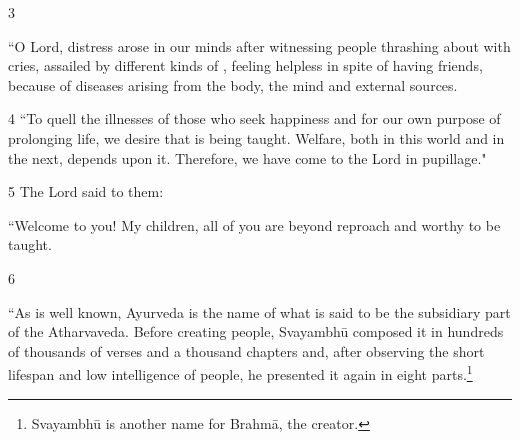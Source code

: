 \documentclass[12pt]{article}
\begin{document}
\begin{translation}
    \item[3]

“O Lord, distress arose in our minds after witnessing people thrashing about with
cries, assailed by different kinds of , 
feeling helpless in spite 
of having friends, because of diseases arising from the body, the mind and
external sources.


    

    \let\uncertain\texttt
    
\item[4]    
“To quell the illnesses of those who seek happiness and for our own purpose of
prolonging life, we desire  that is being
taught.  Welfare, both in this world and in
    the next, depends upon it. Therefore, we have come to the Lord in pupillage." %


\item[5] The Lord said to them:

“Welcome to you!  My children, all of you are beyond reproach and worthy 
to be taught.
   
    
    \item[6] 
%    
    
    “As is well known, Ayurveda is the name of what is said to be the subsidiary
part of the Atharvaveda.   Before creating people, Svayambhū composed it in
hundreds of thousands of verses and a thousand chapters and, after observing the
short lifespan and low intelligence of people, he presented it again in eight
parts.\footnote{Svayambhū is another name for Brahmā, the creator.}
    

\end{translation}
\end{document}
